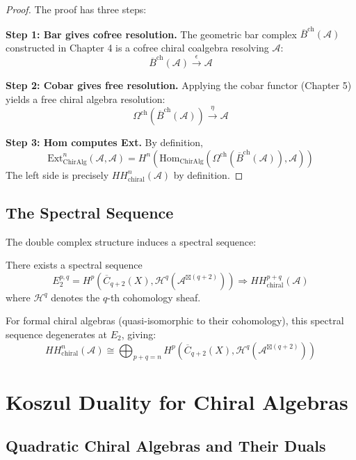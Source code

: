 \begin{proof}
The proof has three steps:

\textbf{Step 1: Bar gives cofree resolution.} 
The geometric bar complex $\overline{B}^{\text{ch}}(\mathcal{A})$ constructed in Chapter 4 is a cofree chiral coalgebra resolving $\mathcal{A}$:
\[
\overline{B}^{\text{ch}}(\mathcal{A}) \xrightarrow{\epsilon} \mathcal{A}
\]

\textbf{Step 2: Cobar gives free resolution.}
Applying the cobar functor (Chapter 5) yields a free chiral algebra resolution:
\[
\Omega^{\text{ch}}(\overline{B}^{\text{ch}}(\mathcal{A})) \xrightarrow{\eta} \mathcal{A}
\]

\textbf{Step 3: Hom computes Ext.}
By definition, 
\[
\text{Ext}^n_{\text{ChirAlg}}(\mathcal{A}, \mathcal{A}) = H^n(\text{Hom}_{\text{ChirAlg}}(\Omega^{\text{ch}}(\overline{B}^{\text{ch}}(\mathcal{A})), \mathcal{A}))
\]
The left side is precisely $HH^n_{\text{chiral}}(\mathcal{A})$ by definition.
\end{proof}

\subsection{The Spectral Sequence}

The double complex structure induces a spectral sequence:

\begin{theorem}
There exists a spectral sequence
\[
E_2^{p,q} = H^p(\overline{C}_{q+2}(X), \mathcal{H}^q(\mathcal{A}^{\boxtimes (q+2)})) \Rightarrow HH^{p+q}_{\text{chiral}}(\mathcal{A})
\]
where $\mathcal{H}^q$ denotes the $q$-th cohomology sheaf.
\end{theorem}

For formal chiral algebras (quasi-isomorphic to their cohomology), this spectral sequence degenerates at $E_2$, giving:
\[
HH^n_{\text{chiral}}(\mathcal{A}) \cong \bigoplus_{p+q=n} H^p(\overline{C}_{q+2}(X), \mathcal{H}^q(\mathcal{A}^{\boxtimes (q+2)}))
\]

\section{Koszul Duality for Chiral Algebras}

\subsection{Quadratic Chiral Algebras and Their Duals}


